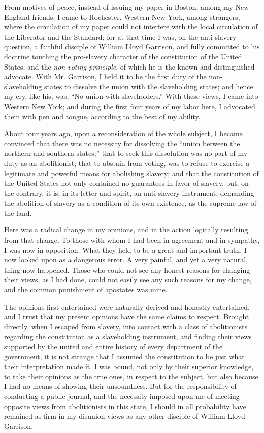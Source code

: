 From motives of peace, instead of issuing my paper in Boston, among my
New England friends, I came to Rochester, Western New York, among
strangers, where the circulation of my paper could not interfere with
the local circulation of the Liberator and the Standard; for at that
time I was, on the anti-slavery question, a faithful disciple of William
Lloyd Garrison, and fully committed to his doctrine touching the
pro-slavery character of the constitution of the United States, and the
\emph{non-voting principle}, of which he is the known and distinguished
advocate. With Mr. Garrison, I held it to be the first duty of the
non-slaveholding states to dissolve the union with the slaveholding
states; and hence my cry, like his, was, ``No union with slaveholders.''
With these views, I {\protect\hypertarget{396}{}{}}came into Western New
York; and during the first four years of my labor here, I advocated them
with pen and tongue, according to the best of my ability.

About four years ago, upon a reconsideration of the whole subject, I
became convinced that there was no necessity for dissolving the ``union
between the northern and southern states;'' that to seek this
dissolution was no part of my duty as an abolitionist; that to abstain
from voting, was to refuse to exercise a legitimate and powerful means
for abolishing slavery; and that the constitution of the United States
not only contained no guarantees in favor of slavery, but, on the
contrary, it is, in its letter and spirit, an anti-slavery instrument,
demanding the abolition of slavery as a condition of its own existence,
as the supreme law of the land.

Here was a radical change in my opinions, and in the action logically
resulting from that change. To those with whom I had been in agreement
and in sympathy, I was now in opposition. What they held to be a great
and important truth, I now looked upon as a dangerous error. A very
painful, and yet a very natural, thing now happened. Those who could not
see any honest reasons for changing their views, as I had done, could
not easily see any such reasons for my change, and the common punishment
of apostates was mine.

The opinions first entertained were naturally derived and honestly
entertained, and I trust that my present opinions have the same claims
to respect. Brought directly, when I escaped from slavery, into contact
with a class of abolitionists regarding the
{\protect\hypertarget{397}{}{}}constitution as a slaveholding
instrument, and finding their views supported by the united and entire
history of every department of the government, it is not strange that I
assumed the constitution to be just what their interpretation made it. I
was bound, not only by their superior knowledge, to take their opinions
as the true ones, in respect to the subject, but also because I had no
means of showing their unsoundness. But for the responsibility of
conducting a public journal, and the necessity imposed upon me of
meeting opposite views from abolitionists in this state, I should in all
probability have remained as firm in my disunion views as any other
disciple of William Lloyd Garrison.

